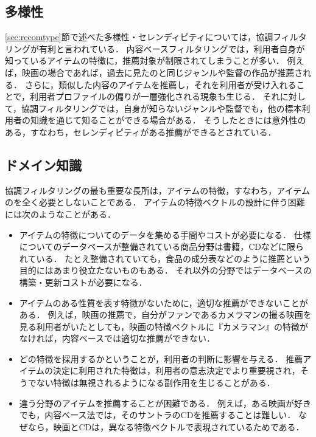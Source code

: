 \subsection{多様性}

\ref{sec:recomtype}節で述べた多様性・セレンディピティについては，協調フィルタリングが有利と言われている．
内容ベースフィルタリングでは，利用者自身が知っているアイテムの特徴に，推薦対象が制限されてしまうことが多い．
例えば，映画の場合であれば，過去に見たのと同じジャンルや監督の作品が推薦される．
さらに，類似した内容のアイテムを推薦し，それを利用者が受け入れることで，利用者プロファイルの偏りが一層強化される現象も生じる．
それに対して，協調フィルタリングでは，自身が知らないジャンルや監督でも，他の標本利用者の知識を通じて知ることができる場合がある．
そうしたときには意外性のある，すなわち，セレンディピティがある推薦ができるとされている．

\subsection{ドメイン知識}

協調フィルタリングの最も重要な長所は，アイテムの特徴，すなわち，アイテムのを全く必要としないことである．
アイテムの特徴ベクトルの設計に伴う困難には次のようなことがある．
\begin{itemize}
 \item
アイテムの特徴についてのデータを集める手間やコストが必要になる．
仕様についてのデータベースが整備されている商品分野は書籍，CDなどに限られている．
たとえ整備されていても，食品の成分表などのように推薦という目的にはあまり役立たないものもある．
それ以外の分野ではデータベースの構築・更新コストが必要になる．
 \item
 アイテムのある性質を表す特徴がないために，適切な推薦ができないことがある．
 例えば，映画の推薦で，自分がファンであるカメラマンの撮る映画を見る利用者がいたとしても，映画の特徴ベクトルに『カメラマン』の特徴がなければ，内容ベースでは適切な推薦ができない．
 \item
 どの特徴を採用するかということが，利用者の判断に影響を与える．
推薦アイテムの決定に利用された特徴は，利用者の意志決定でより重要視され，そうでない特徴は無視されるようになる副作用を生じることがある\cite{ec:029}．
 \item
 違う分野のアイテムを推薦することが困難である．
 例えば，ある映画が好きでも，内容ベース法では，そのサントラのCDを推薦することは難しい．
 なぜなら，映画とCDは，異なる特徴ベクトルで表現されているためである．
\end{itemize}

